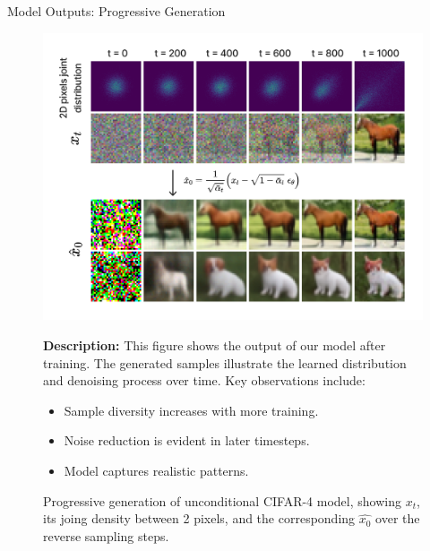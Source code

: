 \documentclass[final]{beamer}
\newlength{\colwidth}
\begin{document}
\begin{frame}[t]
\begin{columns}[t]
\begin{column}{\colwidth}
\begin{block}{Model Outputs: Progressive Generation}
				\begin{figure}[h]
					\centering
					\begin{minipage}{0.6\textwidth}
						\includegraphics[width=\linewidth]{figs/model_outputs.png}
						\caption{Progressive generation of unconditional CIFAR-4 model, showing $x_{t}$, its joing density between 2 pixels, and the corresponding $\hat{x_{0}}$ over the reverse sampling steps.}
					\end{minipage}%
					\begin{minipage}{0.4\textwidth}
						\textbf{Description:} This figure shows the output of our model after training. The generated samples illustrate the learned distribution and denoising process over time. Key observations include:
						\begin{itemize}
							\item Sample diversity increases with more training.
							\item Noise reduction is evident in later timesteps.
							\item Model captures realistic patterns.
						\end{itemize}
					\end{minipage}
				\end{figure}

			\end{block}




\end{column}
\end{columns}
\end{frame}
\end{document}
